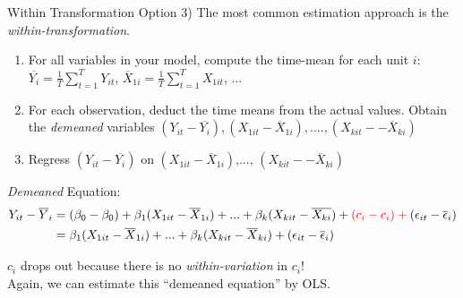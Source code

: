 \documentclass[11pt, aspectratio = 169]{beamer}
\begin{document}
\begin{frame}{Within Transformation}
Option 3) The most common estimation approach is the \textit{within-transformation}.

\begin{enumerate}
    \item For all variables in your model, compute the time-mean for each unit $i$: \\
\hspace{+0.3cm} $\overline{Y_{i}} = \frac{1}{T} \sum_{t=1}^T Y_{it}$, $\overline{X}_{1i} = \frac{1}{T} \sum_{t=1}^T X_{1it}$, ...
\pause
    \item For each observation, deduct the time means from the actual values. Obtain the \textit{demeaned} variables $(Y_{it}-\overline{Y_{i}}),  (X_{1it}-\overline{X}_{1i}),...., (X_{kit}−-\overline{X}_{ki})$
    \pause
    \item  Regress  $(Y_{it}-\overline{Y_{i}})$ on $(X_{1it}-\overline{X}_{1i})$,..., $(X_{kit}-−\overline{X}_{ki})$
\end{enumerate}

\textit{Demeaned} Equation:
\begin{align*}
Y_{it}-\overline{Y}_{i} & = (\beta_0 -\beta_0) + \beta_1(X_{1it}-\overline{X}_{1i}) + ...+ \beta_k(X_{kit}-\overline{X_{ki}}) + \color{red}(c_i- c_i) +\color{black} (\epsilon_{it} -\overline{\epsilon}_i) \\
& =\beta_1(X_{1it}-\overline{X}_{1i}) + ...+ \beta_k(X_{kit}-\overline{X}_{ki}) + (\epsilon_{it}-\overline{\epsilon}_i) 
\end{align*}

$c_i$ drops out because there is no \textit{within-variation} in $c_i$! \\
Again, we can estimate this “demeaned equation” by OLS.
\end{frame}

\end{document}
